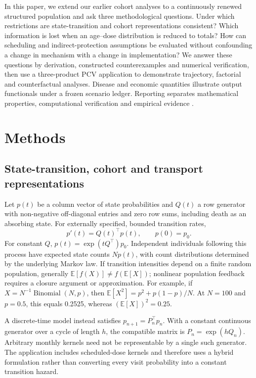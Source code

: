 \documentclass[10pt,letterpaper]{article}
\begin{document}
In this paper, we extend our earlier cohort analyses to a continuously renewed structured population and ask three methodological questions. Under which restrictions are state-transition and cohort representations consistent? Which information is lost when an age--dose distribution is reduced to totals? How can scheduling and indirect-protection assumptions be evaluated without confounding a change in mechanism with a change in implementation? We answer these questions by derivation, constructed counterexamples and numerical verification, then use a three-product PCV application to demonstrate trajectory, factorial and counterfactual analyses. Disease and economic quantities illustrate output functionals under a frozen scenario ledger. Reporting separates mathematical properties, computational verification and empirical evidence \cite{Caro2012ModelingOverview,Pitman2012DynamicTransmission,Husereau2022CHEERS}.

\section{Methods}
\subsection{State-transition, cohort and transport representations}
Let $p(t)$ be a column vector of state probabilities and $Q(t)$ a row generator with non-negative off-diagonal entries and zero row sums, including death as an absorbing state. For externally specified, bounded transition rates,
\begin{equation}
 p'(t)=Q(t)^\top p(t),\qquad p(0)=p_0.
 \label{eq:markov}
\end{equation}
For constant $Q$, $p(t)=\exp(tQ^\top)p_0$. Independent individuals following this process have expected state counts $Np(t)$, with count distributions determined by the underlying Markov law. If transition intensities depend on a finite random population, generally $\mathbb E[f(X)]\ne f(\mathbb E[X])$; nonlinear population feedback requires a closure argument or approximation. For example, if $X=N^{-1}\operatorname{Binomial}(N,p)$, then $\mathbb E[X^2]=p^2+p(1-p)/N$. At $N=100$ and $p=0.5$, this equals 0.2525, whereas $(\mathbb E[X])^2=0.25$.

A discrete-time model instead satisfies $p_{n+1}=P_n^\top p_n$. With a constant continuous generator over a cycle of length $h$, the compatible matrix is $P_n=\exp(hQ_n)$. Arbitrary monthly kernels need not be representable by a single such generator. The application includes scheduled-dose kernels and therefore uses a hybrid formulation rather than converting every visit probability into a constant transition hazard.
\end{document}
